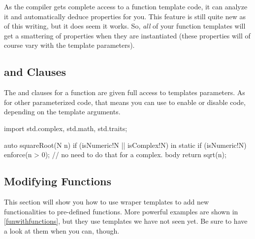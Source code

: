 As the compiler gets complete access to a function template code, it can analyze it and automatically deduce properties for you. This feature is still quite new as of this writing, but it does seem it works. So, \emph{all} of your function templates will get a smattering of properties when they are instantiated (these properties will of course vary with the template parameters).

\subsection{ and  Clauses}\label{inandoutclauses}

The  and  clauses for a function are given full access to templates parameters. As for other parameterized code, that means you can use  to enable or disable code, depending on the template arguments.

\begin{dcode}
import std.complex, std.math, std.traits;

auto squareRoot(N n) if (isNumeric!N || isComplex!N)
in 
{
    static if (isNumeric!N)
        enforce(n > 0);
    // no need to do that for a complex.
}
body
{
    return sqrt(n);
}
\end{dcode}

\subsection{Modifying Functions}\label{modifyingfunctions}

This section will show you how to use wraper templates to add new functionalities to pre-defined functions. More powerful examples are shown in \autoref{funwithfunctions}, but they use templates we have not seen yet. Be sure to have a look at them when you can, though.


